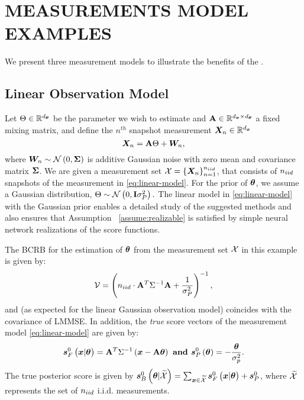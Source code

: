 \section{MEASUREMENTS MODEL EXAMPLES}\label{sec:example_models}
We present three measurement models to illustrate the benefits of the \name.

\subsection{Linear Observation Model}\label{sec:linear_model} 
Let $\Theta\in\mathbb{R}^{{d_{\bm{\theta}}}}$ be the parameter {we wish to estimate} and $\mathbf{A}\in\mathbb{R}^{{{d_{\bm{x}}}}\times {d_{\bm{\theta}}}}$  a fixed mixing matrix, %
and define the  ${n}^{th}$ snapshot measurement ${\X}_{n}\in\mathbb{R}^{{\nx}}$ %
\begin{equation}\label{eq:linear-model}
    {\randomvec{X}}_{{n}}=\matsym{A}\pr+\randomvec{W}_{n},
\end{equation}
where $\randomvec{W}_{{n}}\sim\normaldis{0}{\matsym{\Sigma}}$ is  additive Gaussian noise with zero mean and covariance matrix $\mathbf{\Sigma}$. 
We are given a measurement set $\xset=\set{{\X}_{n}}_{{n}=1}^{\niideval}$,
that consists of $n_{iid}$ snapshots of the measurement in \eqref{eq:linear-model}.  %
For the prior of $\bm{\theta}$, we assume a Gaussian distribution,  $\Theta\sim\mathcal{N}\left(0,\mathbf{I}\sigma_P^2\right).$  The linear model in \eqref{eq:linear-model}  with the Gaussian prior enables a detailed {study} of the suggested methods and also ensures that Assumption ~\ref{assume:realizable} %
{is satisfied by simple neural network realizations of the score functions}. 

The BCRB for %
the estimation of $\bm{\theta}$ from the measurement {set $\mathcal{X}$} in this example is given by:
\begin{align}\label{eq:bcrb_linear}
\mathcal{V}=\left({n_{iid}} \cdot\mathbf{A}^T\Sigma^{-1}\mathbf{A}+\frac{1}{\sigma_P^2}\right)^{-1},
\end{align}
and %
{(as expected for the linear Gaussian observation model)} coincides with the covariance of LMMSE. In addition, the {\emph{true}} score vectors of the measurement model  \eqref{eq:linear-model} are given by:
\begin{equation}\label{eq:score_opt_linear}
\bm{s}^{0}_F\left({\bm{x}}|\bm{\theta}\right)=  \mathbf{A}^T\Sigma^{-1}\left({\bm{x}}-\mathbf{A}\bm{\theta}\right)\textbf{ and } \bm{s}^{0}_P\left(\bm{\theta}\right)=-\frac{\bm{\theta}}{\sigma_p^2}.
\end{equation}
{The true posterior score is given by $\bm{s}^{0}_B\left(\bm{\theta}|\widetilde{\mathcal{X}}\right)=\sum_{\bm{x}\in\widetilde{\mathcal{X}}}\bm{s}^{0}_F\left({\bm{x}}|\bm{\theta}\right)+\bm{s}^{0}_P$, where $\widetilde{\mathcal{X}}$ represents the set of $n_{iid}$ i.i.d. measurements. }

